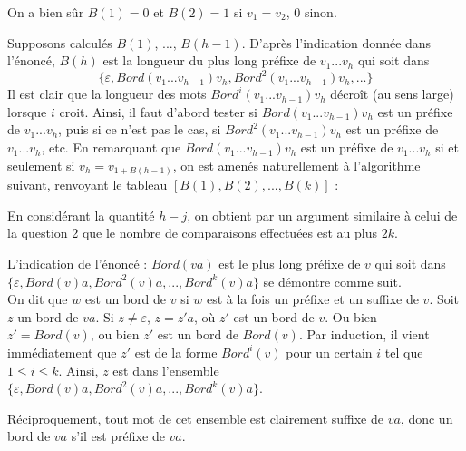 \Q
On a bien sûr $B(1)=0$ et $B(2)=1$ si $v_1=v_2$, 0 sinon.
\smallskip

Supposons calculés $B(1)$, ..., $B(h-1)$. D'après l'indication donnée dans l'énoncé, $B(h)$ est la longueur du plus long préfixe de $v_1...v_h$ qui soit dans
\[
    \{\varepsilon, Bord(v_1...v_{h-1})v_h,Bord^2(v_1...v_{h-1})v_h, ...\}
\]
Il est clair que la longueur des mots $Bord^i(v_1...v_{h-1})v_h$ décroît (au sens large) lorsque $i$ croit. Ainsi, il faut d'abord tester si $Bord(v_1...v_{h-1})v_h$ est un préfixe de $v_1...v_h$, puis si ce n'est pas le cas, si $Bord^2(v_1...v_{h-1})v_h$ est un préfixe de $v_1...v_h$, etc. En remarquant que $Bord(v_1...v_{h-1})v_h$ est un préfixe de $v_1...v_h$ si et seulement si $v_h=v_{1+B(h-1)}$, on est amenés naturellement à l'algorithme suivant, renvoyant le tableau $[B(1), B(2), ..., B(k)]$ :



En considérant la quantité $h-j$, on obtient par un argument similaire à celui de la question 2 que le nombre de comparaisons effectuées est au plus $2k$.
\bigskip

L'indication de l'énoncé : $Bord(va)$ est le plus long préfixe de $v$ qui soit dans \newline $\{\varepsilon, Bord(v)a,Bord^2(v)a, ..., Bord^k(v)a\}$ se démontre comme suit.\\
On dit que $w$ est un bord de $v$ si $w$ est à la fois un préfixe et un suffixe de $v$. Soit $z$ un bord de $va$. Si $z \neq \varepsilon$, $z = z'a$, où $z'$ est un bord de $v$. Ou bien $z'=Bord(v)$, ou bien $z'$ est un bord de $Bord(v)$. Par induction, il vient immédiatement que $z'$ est de la forme $Bord^i(v)$ pour un certain $i$ tel que $1 \leq i \leq k$. Ainsi, $z$ est dans l'ensemble $\{\varepsilon, Bord(v)a,Bord^2(v)a, ..., Bord^k(v)a\}$.
\smallskip

Réciproquement, tout mot de cet ensemble est clairement suffixe de $va$, donc un bord de $va$ s'il est préfixe de $va$.
\bigskip

\Fin
